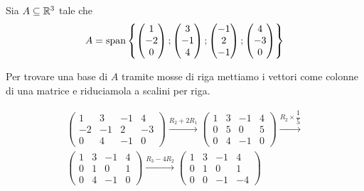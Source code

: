 \begin{example}
    Sia $A \subseteq \mathbb{R}^3$ tale che \[
        A = \operatorname{span}\left\{\begin{pmatrix}
            1 \\ -2 \\ 0
        \end{pmatrix}; \begin{pmatrix}
            3 \\ -1 \\ 4
        \end{pmatrix}; \begin{pmatrix}
            -1 \\ 2 \\ -1
        \end{pmatrix}; \begin{pmatrix}
            4 \\ -3 \\ 0
        \end{pmatrix}\right\}    
    \]

    Per trovare una base di $A$ tramite mosse di riga mettiamo i vettori come colonne di una matrice e riduciamola a scalini per riga.

    \begin{align*}
        \begin{pmatrix}
            1 & 3 & -1 & 4 \\ -2 & -1 & 2 & -3 \\ 0 & 4 & -1 & 0
        \end{pmatrix} \xrightarrow[]{R_2 + 2R_1}
        \begin{pmatrix}
            1 & 3 & -1 & 4 \\ 0 & 5 & 0 & 5 \\ 0 & 4 & -1 & 0
        \end{pmatrix} \xrightarrow[]{R_2 \times \dfrac{1}{5}} \\
        \begin{pmatrix}
            1 & 3 & -1 & 4 \\ 0 & 1 & 0 & 1 \\ 0 & 4 & -1 & 0
        \end{pmatrix} \xrightarrow[]{R_3 -4R_2}
        \begin{pmatrix}
            1 & 3 & -1 & 4 \\ 0 & 1 & 0 & 1 \\ 0 & 0 & -1 & -4
        \end{pmatrix}
    \end{align*}


\end{example}
